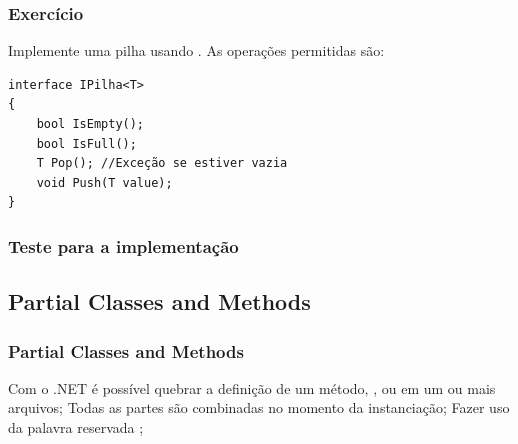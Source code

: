 \documentclass{beamer}
\begin{document}
\begin{frame}[fragile]
\frametitle{Exercício}
\begin{outline}
	\1 Implemente uma pilha usando . As operações permitidas são:	
	\1 []
	\begin{lstlisting}
interface IPilha<T>
{
	bool IsEmpty(); 
	bool IsFull();
	T Pop(); //Exceção se estiver vazia
	void Push(T value);
}	
	\end{lstlisting}
\end{outline}
\end{frame}

\begin{frame}[fragile]
\frametitle{Teste para a implementação}

\end{frame}

\subsection{Partial Classes and Methods}

\begin{frame}
\frametitle{Partial Classes and Methods}
\begin{outline}
	\1 Com o .NET é possível quebrar a definição de um método, ,  ou  em um ou mais arquivos;
	\1 Todas as partes são combinadas no momento da instanciação;
	\1 Fazer uso da palavra reservada ;	
\end{outline}
\end{frame}
\end{document}
